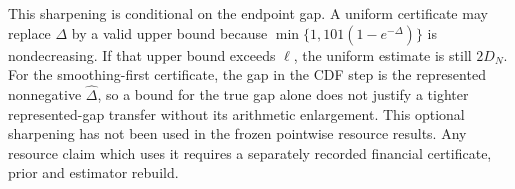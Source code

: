 This sharpening is conditional on the endpoint gap. A uniform certificate
may replace $\Delta$ by a valid upper bound because
$\min\{1,101(1-e^{-\Delta})\}$ is nondecreasing. If that upper bound
exceeds $\ell$, the uniform estimate is still $2D_N$. For the
smoothing-first certificate, the gap in the CDF step is the represented
nonnegative $\widehat\Delta$, so a bound for the true gap alone does not
justify a tighter represented-gap transfer without its arithmetic
enlargement. This optional sharpening has not been used in the frozen
pointwise resource results. Any resource claim which uses it requires a
separately recorded financial certificate, prior and estimator rebuild.
